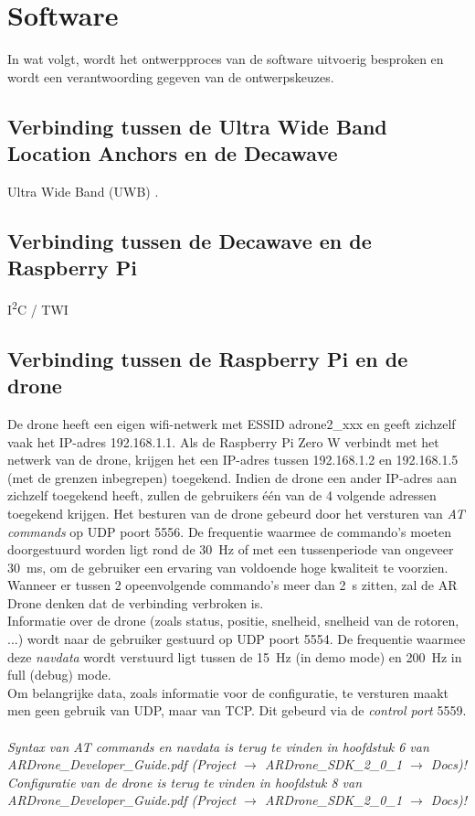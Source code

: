 \chapter{Software}
In wat volgt, wordt het ontwerpproces van de software uitvoerig besproken en wordt een verantwoording gegeven van de ontwerpskeuzes.

\section{Verbinding tussen de Ultra Wide Band Location Anchors en de Decawave} \label{sec:uwb_decawave}
Ultra Wide Band (UWB) \cite{alarifi2016ultra}.

\section{Verbinding tussen de Decawave en de Raspberry Pi} \label{sec:decawave_raspberry}
I\textsuperscript{2}C / TWI

\section{Verbinding tussen de Raspberry Pi en de drone} \label{sec:raspberry_drone}
De drone heeft een eigen wifi-netwerk met ESSID adrone2\_xxx en geeft zichzelf vaak het IP-adres 192.168.1.1.
Als de Raspberry Pi Zero W verbindt met het netwerk van de drone, krijgen het een IP-adres tussen 192.168.1.2 en 192.168.1.5 (met de grenzen inbegrepen) toegekend.
Indien de drone een ander IP-adres aan zichzelf toegekend heeft, zullen de gebruikers één van de 4 volgende adressen toegekend krijgen.
Het besturen van de drone gebeurd door het versturen van \textit{AT commands} op UDP poort 5556.
De frequentie waarmee de commando's moeten doorgestuurd worden ligt rond de \SI{30}{\Hz} of met een tussenperiode van ongeveer \SI{30}{\ms}, om de gebruiker een ervaring van voldoende hoge kwaliteit te voorzien.
Wanneer er tussen 2 opeenvolgende commando's meer dan \SI{2}{\s} zitten, zal de AR Drone denken dat de verbinding verbroken is.\\
Informatie over de drone (zoals status, positie, snelheid, snelheid van de rotoren, ...) wordt naar de gebruiker gestuurd op UDP poort 5554.
De frequentie waarmee deze \textit{navdata} wordt verstuurd ligt tussen de \SI{15}{\Hz} (in demo mode) en \SI{200}{\Hz} in full (debug) mode.\\
Om belangrijke data, zoals informatie voor de configuratie, te versturen maakt men geen gebruik van UDP, maar van TCP.
Dit gebeurd via de \textit{control port} 5559.\\
\\
\textit{Syntax van AT commands en navdata is terug te vinden in hoofdstuk 6 van ARDrone\_Developer\_Guide.pdf (Project $\to$ ARDrone\_SDK\_2\_0\_1 $\to$ Docs)!}\\
\textit{Configuratie van de drone is terug te vinden in hoofdstuk 8 van ARDrone\_Developer\_Guide.pdf (Project $\to$ ARDrone\_SDK\_2\_0\_1 $\to$ Docs)!}

